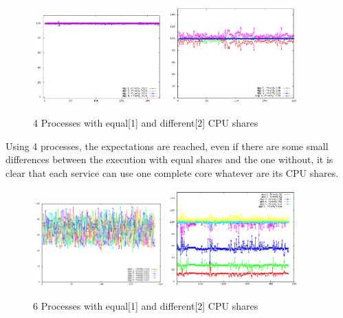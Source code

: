 \begin{figure}[h!]
\begin{center}
	\includegraphics[width=0.45\textwidth]{./Images/CpuMonitor/laptop/4_equalshares.png}
	\includegraphics[width=0.45\textwidth]{./Images/CpuMonitor/laptop/4_differentshares.png}
	\caption{4 Processes with equal[1] and different[2] CPU shares}
\end{center}
\end{figure}

Using 4 processes, the expectations are reached, even if there are some small
differences between the execution with equal shares and the one without, it is
clear that each service can use one complete core whatever are its CPU shares.

\begin{figure}[h!]
\begin{center}
	\includegraphics[width=0.45\textwidth]{./Images/CpuMonitor/laptop/6_equalshares.png}
	\includegraphics[width=0.45\textwidth]{./Images/CpuMonitor/laptop/6_differentshares.png}
	\caption{6 Processes with equal[1] and different[2] CPU shares}
\end{center}
\end{figure}

